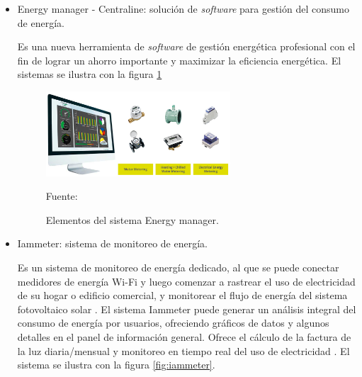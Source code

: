 \documentclass[a4paper, 12pt]{article}
\begin{document}
\begin{itemize}

\item {Energy manager - Centraline}: solución de \emph{software} para gestión del consumo de energía.

Es una nueva herramienta de \emph{software} de gestión energética profesional con el fin de lograr un ahorro importante y maximizar la eficiencia energética. El sistemas se ilustra con la figura \ref{fig:energy-vision} 

\begin{figure}[ht]
\begin{center}
\includegraphics[width=0.65\textwidth]{energy-vision}
\end{center}
\begin{center}
\vskip -0.5cm
\caption{\small{Elementos del sistema Energy manager.}}
\label{fig:energy-vision}
{\small{Fuente: \citep{WEBSITE:13}}}
\end{center}
\end{figure}

\item {Iammeter}: sistema de monitoreo de energía.

Es un sistema de monitoreo de energía dedicado, al que se puede conectar medidores de energía Wi-Fi y luego comenzar a rastrear el uso de electricidad de su hogar o edificio comercial, y monitorear el flujo de energía del sistema fotovoltaico solar \citep{WEBSITE:11}.
El sistema Iammeter puede generar un análisis integral del consumo de energía por usuarios, ofreciendo gráficos de datos y algunos detalles en el panel de información general. Ofrece el cálculo de la factura de la luz diaria/mensual y monitoreo en tiempo real del uso de electricidad \citep{WEBSITE:12}. El sistema se ilustra con la figura \ref{fig:iammeter}.


\end{itemize}
\end{document}
